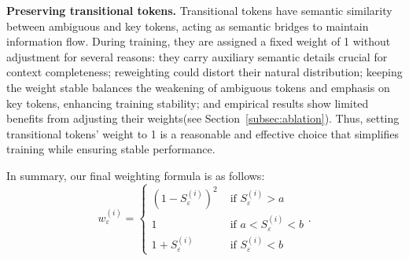 \textbf{Preserving transitional tokens.} 
Transitional tokens have semantic similarity between ambiguous and key tokens, acting as semantic bridges to maintain information flow. During training, they are assigned a fixed weight of 1 without adjustment for several reasons: they carry auxiliary semantic details crucial for context completeness; reweighting could distort their natural distribution; keeping the weight stable balances the weakening of ambiguous tokens and emphasis on key tokens, enhancing training stability; and empirical results show limited benefits from adjusting their weights(see Section~\ref{subsec:ablation}). Thus, setting transitional tokens’ weight to 1 is a reasonable and effective choice that simplifies training while ensuring stable performance.

In summary, our final weighting formula is as follows:
\begin{equation}
w_{\varepsilon}^{(i)}=
\begin{cases}
  (1 - S_\varepsilon^{(i)})^2&     \text{ if } S_\varepsilon^{(i)} > a \\
  1&   \text{ if } a<S_\varepsilon^{(i)} < b \\
  1 + S_\varepsilon^{(i)}&   \text{ if } S_\varepsilon^{(i)} < b
\end{cases}.
\end{equation}

